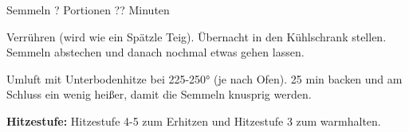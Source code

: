 \begin{recipe}{Semmeln} {? Portionen} {?? Minuten}

  \freeform
  \textit{}


  Verrühren (wird wie ein Spätzle Teig).
  Übernacht in den Kühlschrank stellen.
  Semmeln abstechen und danach nochmal etwas gehen lassen.

  \newstep
  Umluft mit Unterbodenhitze bei 225-250° (je nach Ofen).
  25 min backen und am Schluss ein wenig heißer, damit die Semmeln knusprig werden.

  \freeform
  \hrulefill

  \freeform
  \textbf{Hitzestufe:}
  Hitzestufe 4-5 zum Erhitzen und Hitzestufe 3 zum warmhalten.

\end{recipe}
